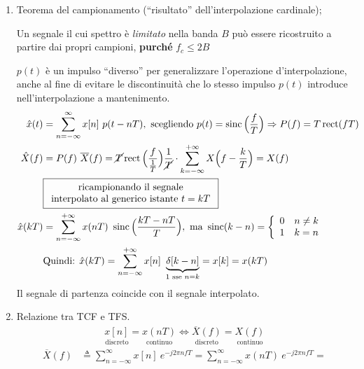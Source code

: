 \documentclass[
]{article}
\begin{document}
\begin{enumerate}
\def\labelenumi{\arabic{enumi}.}
\setcounter{enumi}{10}
\item
  Teorema del campionamento (``risultato'' dell'interpolazione
  cardinale);

  Un segnale il cui spettro è \emph{limitato} nella banda \(B\) può
  essere ricostruito a partire dai propri campioni, \textbf{purché}
  \(f_c \leq 2B\)

  \(p(t)\) è un impulso ``diverso'' per generalizzare l'operazione
  d'interpolazione, anche al fine di evitare le discontinuità che lo
  stesso impulso \(p(t)\) introduce nell'interpolazione a mantenimento.
  \begin{align*}
  \hat{x}(t)&= \sum_{n=-\infty}^{\infty} x[n] \ p(t-nT), \ \text{scegliendo } p(t)= \mathop{\mathrm{sinc}}\Big(\frac{f}{T}\Big) \Rightarrow P(f)=T\mathop{\mathrm{rect}}(fT) \\ 
  \hat{X}(f)&= P(f) \ \overline{X}(f) = \cancel{T}\mathop{\mathrm{rect}}\Big(\frac{f}{\frac{1}{T}}\Big)\frac{1}{\cancel{T}}\cdot  \sum_{k=-\infty}^{+\infty} X\Big(f-\frac{k}{T}\Big)= X(f) \\
     &\boxed{\begin{array}{cl}
    \text{ricampionando il segnale}
    \\
     \text{interpolato al generico istante } t=kT
    \end{array}}&
    \\
  \hat{x}(kT) &=\sum_{n=-\infty}^{+\infty} x(nT) \ \mathop{\mathrm{sinc}}\Big(\frac{kT-nT}{T}\Big), \text{ ma } \mathop{\mathrm{sinc}}(k-n)=
  \left\{ \begin{array}{cl}
  0 & n\neq k \\
  1 & k=n
  \end{array} 
  \right. \\
  &\text{Quindi: } \hat{x}(kT)=\sum_{n=-\infty}^{+\infty}x[n] \ \underbrace{\delta[k-n]}_{1\text{ sse }n=k}= x[k] = x(kT)
  \end{align*} Il segnale di partenza coincide con il segnale
  interpolato.
\item
  Relazione tra TCF e TFS. \begin{align*}
  \underset{\text{discreto}}{x[n]}=\underset{\text{continuo}}{x(nT)} \Longleftrightarrow \underset{\text{discreto}}{\overline{X}(f)} = \underset{\text{continuo}}{X(f)}
  \end{align*} \begin{align*}
  \overline{X}(f) &\triangleq \sum_{n=-\infty}^{\infty} x[n] \ e^{-j2\pi nfT} = \sum_{n=-\infty}^{\infty} x(nT) \ e^{-j2\pi nfT}=

\end{align*}
\end{enumerate}
\end{document}
